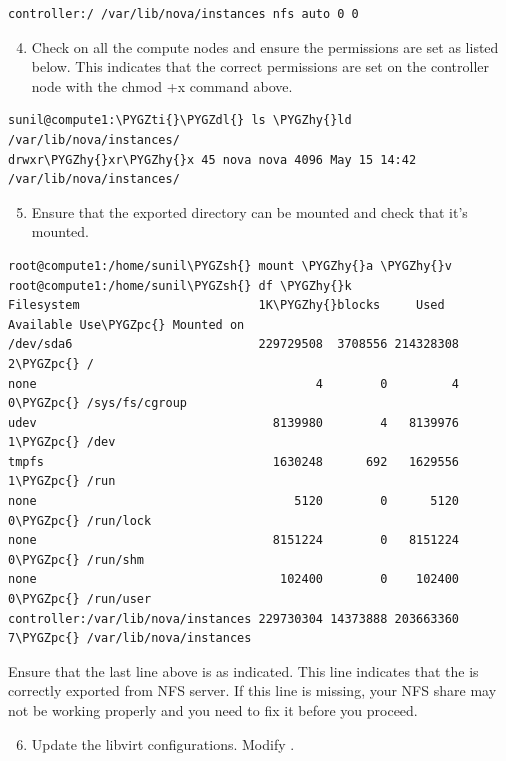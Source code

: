 \documentclass[letterpaper,10pt,english]{sphinxmanual}
\def\PYGZsh{\char`\#}
\def\PYGZpc{\char`\%}
\def\PYGZdl{\char`\$}
\def\PYGZhy{\char`\-}
\def\PYGZti{\char`\~}
\begin{document}
\begin{Verbatim}[commandchars=\\\{\}]
controller:/ /var/lib/nova/instances nfs auto 0 0
\end{Verbatim}
\begin{enumerate}
\setcounter{enumi}{3}
\item {} 
Check on all the compute nodes and ensure the permissions are set as listed below. This indicates that the correct permissions are set on the controller node with the chmod +x command above.

\end{enumerate}

\begin{Verbatim}[commandchars=\\\{\}]
sunil@compute1:\PYGZti{}\PYGZdl{} ls \PYGZhy{}ld /var/lib/nova/instances/
drwxr\PYGZhy{}xr\PYGZhy{}x 45 nova nova 4096 May 15 14:42 /var/lib/nova/instances/
\end{Verbatim}
\begin{enumerate}
\setcounter{enumi}{4}
\item {} 
Ensure that the exported directory can be mounted and check that it’s mounted.

\end{enumerate}

\begin{Verbatim}[commandchars=\\\{\}]
root@compute1:/home/sunil\PYGZsh{} mount \PYGZhy{}a \PYGZhy{}v
root@compute1:/home/sunil\PYGZsh{} df \PYGZhy{}k
Filesystem                         1K\PYGZhy{}blocks     Used Available Use\PYGZpc{} Mounted on
/dev/sda6                          229729508  3708556 214328308   2\PYGZpc{} /
none                                       4        0         4   0\PYGZpc{} /sys/fs/cgroup
udev                                 8139980        4   8139976   1\PYGZpc{} /dev
tmpfs                                1630248      692   1629556   1\PYGZpc{} /run
none                                    5120        0      5120   0\PYGZpc{} /run/lock
none                                 8151224        0   8151224   0\PYGZpc{} /run/shm
none                                  102400        0    102400   0\PYGZpc{} /run/user
controller:/var/lib/nova/instances 229730304 14373888 203663360   7\PYGZpc{} /var/lib/nova/instances
\end{Verbatim}

Ensure that the last line above is as indicated. This line indicates that the  is correctly exported from NFS server. If this line is missing, your NFS share may not be working properly and you need to fix it before you proceed.
\begin{enumerate}
\setcounter{enumi}{5}
\item {} 
Update the libvirt configurations. Modify .

\end{enumerate}
\end{document}
